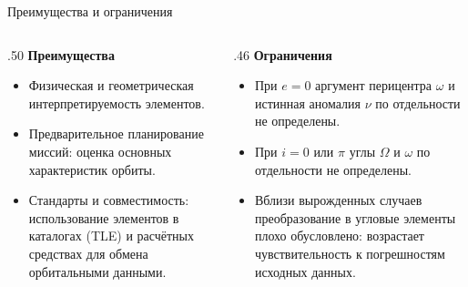 \documentclass[11pt,aspectratio=169,t]{beamer}
\begin{document}
\begin{frame}{Преимущества и ограничения}
\begin{columns}[T,onlytextwidth]
\begin{column}{.50\textwidth}
\textcolor{courseaccent}{\textbf{Преимущества}}
\begin{itemize}
\item Физическая и геометрическая интерпретируемость элементов.
\item Предварительное планирование миссий: оценка основных характеристик орбиты.
\item Стандарты и совместимость: использование элементов в каталогах (TLE) и расчётных средствах для обмена орбитальными данными.
\end{itemize}
\end{column}
\begin{column}{.46\textwidth}
\textcolor{courseaccent}{\textbf{Ограничения}}
\begin{itemize}
\item При $e=0$ аргумент перицентра $\omega$ и истинная аномалия $\nu$ по отдельности не определены.
\item При $i=0$ или $\pi$ углы $\Omega$ и $\omega$ по отдельности не определены.
\item Вблизи вырожденных случаев преобразование в угловые элементы плохо обусловлено: возрастает чувствительность к погрешностям исходных данных.
\end{itemize}
\end{column}
\end{columns}
\end{frame}
\end{document}
